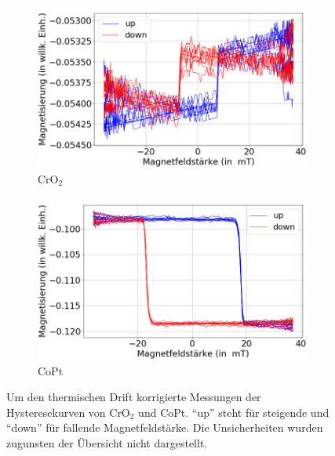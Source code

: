 \begin{figure}[H]
    \centering
    \begin{subfigure}{0.495\textwidth}
        \centering
        \includegraphics[width=1.1\textwidth]{plots/swp_all_magn_cro}
    \caption{CrO$_2$}
    \end{subfigure}
    \begin{subfigure}{0.495\textwidth}
        \centering
        \includegraphics[width=1.1\textwidth]{plots/swp_all_magn_copt}
        \caption{CoPt}
    \end{subfigure}
    \caption{Um den thermischen Drift korrigierte Messungen der Hysteresekurven von CrO$_2$ und CoPt. \enquote{up} steht für steigende und \enquote{down} für fallende Magnetfeldstärke. Die Unsicherheiten wurden zugunsten der Übersicht nicht dargestellt.}
    \label{fig_moke_einzeln}
\end{figure}



